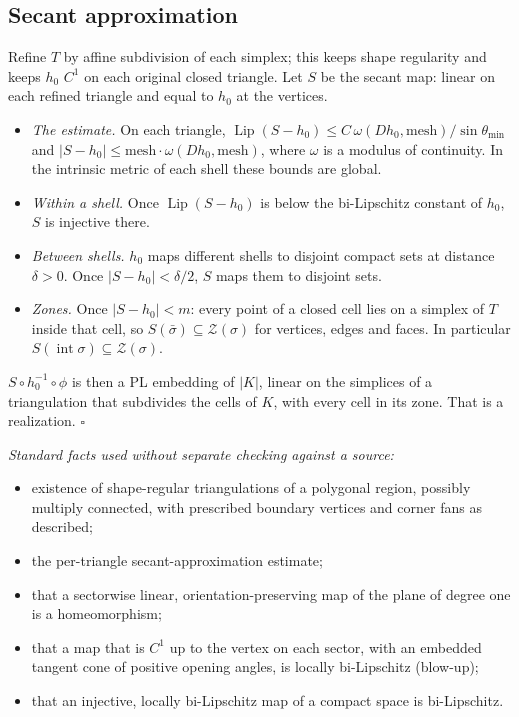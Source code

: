 \documentclass[preprint,12pt]{elsarticle}
\theoremstyle{definition}
\theoremstyle{remark}
\newcommand{\Z}{\mathcal{Z}}
\newcommand{\inter}{\operatorname{int}}
\begin{document}
\subsection{Secant approximation}
Refine $T$ by affine subdivision of each simplex; this keeps shape regularity and keeps $h_0$ $C^1$ on each original
closed triangle. Let $S$ be the secant map: linear on each refined triangle and equal to $h_0$ at the vertices.
\begin{itemize}
\item \emph{The estimate.} On each triangle, $\operatorname{Lip}(S-h_0)\le C\,\omega(Dh_0,\mathrm{mesh})/\sin\theta_{\min}$ and
$|S-h_0|\le\mathrm{mesh}\cdot\omega(Dh_0,\mathrm{mesh})$, where $\omega$ is a modulus of continuity. In the intrinsic
metric of each shell these bounds are global.
\item \emph{Within a shell.} Once $\operatorname{Lip}(S-h_0)$ is below the bi-Lipschitz constant of $h_0$, $S$ is
injective there.
\item \emph{Between shells.} $h_0$ maps different shells to disjoint compact sets at distance $\delta>0$. Once
$|S-h_0|<\delta/2$, $S$ maps them to disjoint sets.
\item \emph{Zones.} Once $|S-h_0|<m$: every point of a closed cell lies on a simplex of $T$ inside that cell, so
$S(\bar\sigma)\subseteq\Z(\sigma)$ for vertices, edges and faces. In particular $S(\inter\sigma)\subseteq\Z(\sigma)$.
\end{itemize}
$S\circ h_0^{-1}\circ\phi$ is then a PL embedding of $|K|$, linear on the simplices of a triangulation that subdivides the
cells of $K$, with every cell in its zone. That is a realization. $\square$

\emph{Standard facts used without separate checking against a source:}
\begin{itemize}
\item existence of shape-regular triangulations of a polygonal region, possibly multiply connected, with prescribed
boundary vertices and corner fans as described;
\item the per-triangle secant-approximation estimate;
\item that a sectorwise linear, orientation-preserving map of the plane of degree one is a homeomorphism;
\item that a map that is $C^1$ up to the vertex on each sector, with an embedded tangent cone of positive opening
angles, is locally bi-Lipschitz (blow-up);
\item that an injective, locally bi-Lipschitz map of a compact space is bi-Lipschitz.
\end{itemize}
\end{document}
